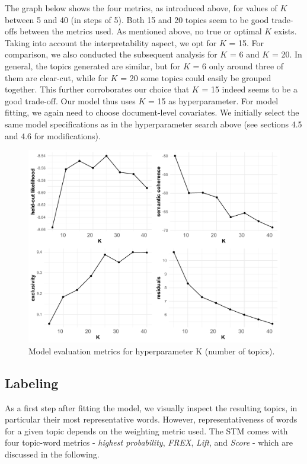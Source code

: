 The graph below shows the four metrics, as introduced above, for values of $K$ between 5 and 40 (in steps of 5). Both 15 and 20 topics seem to be good trade-offs between the metrics used. As mentioned above, no true or optimal $K$ exists. Taking into account the interpretability aspect, we opt for $K$ = 15. For comparison, we also conducted the subsequent analysis for $K$ = 6 and $K$ = 20. In general, the topics generated are similar, but for $K$ = 6 only around three of them are clear-cut, while for $K$ = 20 some topics could easily be grouped together. This further corroborates our choice that $K$ = 15 indeed seems to be a good trade-off. Our model thus uses $K$ = 15 as hyperparameter. For model fitting, we again need to choose document-level covariates. We initially select the same model specifications as in the hyperparameter search above (see sections 4.5 and 4.6 for modifications).

\begin{figure}[h!]
  \centering
  \captionsetup{justification=centering,margin=2cm}
  \includegraphics[scale = 0.5]{../plots/4_1/searchK.pdf}
  \caption{Model evaluation metrics for hyperparameter K (number of topics).}
  \label{fig:searchK}
\end{figure}

\subsection{Labeling}

As a first step after fitting the model, we visually inspect the resulting topics, in particular their most representative words. However, representativeness of words for a given topic depends on the weighting metric used. The STM comes with four topic-word metrics - \textit{highest probability}, \textit{FREX}, \textit{Lift}, and \textit{Score} - which are discussed in the following.

